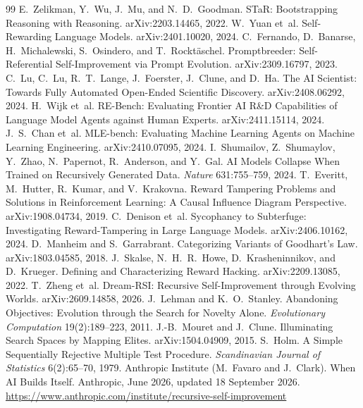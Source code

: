 \documentclass[11pt,a4paper]{article}
\begin{document}
\begin{thebibliography}{99}
 E.~Zelikman, Y.~Wu, J.~Mu, and N.~D.~Goodman. STaR: Bootstrapping Reasoning with Reasoning. arXiv:2203.14465, 2022.
 W.~Yuan et~al. Self-Rewarding Language Models. arXiv:2401.10020, 2024.
 C.~Fernando, D.~Banarse, H.~Michalewski, S.~Osindero, and T.~Rockt\"aschel. Promptbreeder: Self-Referential Self-Improvement via Prompt Evolution. arXiv:2309.16797, 2023.
 C.~Lu, C.~Lu, R.~T.~Lange, J.~Foerster, J.~Clune, and D.~Ha. The AI Scientist: Towards Fully Automated Open-Ended Scientific Discovery. arXiv:2408.06292, 2024.
 H.~Wijk et~al. RE-Bench: Evaluating Frontier AI R\&D Capabilities of Language Model Agents against Human Experts. arXiv:2411.15114, 2024.
 J.~S.~Chan et~al. MLE-bench: Evaluating Machine Learning Agents on Machine Learning Engineering. arXiv:2410.07095, 2024.
 I.~Shumailov, Z.~Shumaylov, Y.~Zhao, N.~Papernot, R.~Anderson, and Y.~Gal. AI Models Collapse When Trained on Recursively Generated Data. \emph{Nature} 631:755--759, 2024.
 T.~Everitt, M.~Hutter, R.~Kumar, and V.~Krakovna. Reward Tampering Problems and Solutions in Reinforcement Learning: A Causal Influence Diagram Perspective. arXiv:1908.04734, 2019.
 C.~Denison et~al. Sycophancy to Subterfuge: Investigating Reward-Tampering in Large Language Models. arXiv:2406.10162, 2024.
 D.~Manheim and S.~Garrabrant. Categorizing Variants of Goodhart's Law. arXiv:1803.04585, 2018.
 J.~Skalse, N.~H.~R.~Howe, D.~Krasheninnikov, and D.~Krueger. Defining and Characterizing Reward Hacking. arXiv:2209.13085, 2022.
 T.~Zheng et~al. Dream-RSI: Recursive Self-Improvement through Evolving Worlds. arXiv:2609.14858, 2026.
 J.~Lehman and K.~O.~Stanley. Abandoning Objectives: Evolution through the Search for Novelty Alone. \emph{Evolutionary Computation} 19(2):189--223, 2011.
 J.-B.~Mouret and J.~Clune. Illuminating Search Spaces by Mapping Elites. arXiv:1504.04909, 2015.
 S.~Holm. A Simple Sequentially Rejective Multiple Test Procedure. \emph{Scandinavian Journal of Statistics} 6(2):65--70, 1979.
 Anthropic Institute (M.~Favaro and J.~Clark). When AI Builds Itself. Anthropic, June 2026, updated 18 September 2026. \url{https://www.anthropic.com/institute/recursive-self-improvement}

\end{thebibliography}
\end{document}

